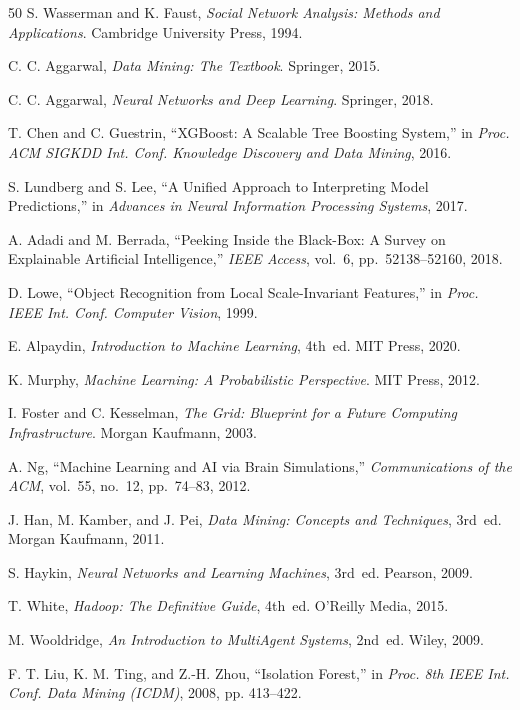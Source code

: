 \documentclass[conference]{IEEEtran}
\begin{document}
\begin{thebibliography}{50}
S. Wasserman and K. Faust, \textit{Social Network Analysis: Methods and Applications}. Cambridge University Press, 1994.

C. C. Aggarwal, \textit{Data Mining: The Textbook}. Springer, 2015.

C. C. Aggarwal, \textit{Neural Networks and Deep Learning}. Springer, 2018.

T. Chen and C. Guestrin, ``XGBoost: A Scalable Tree Boosting System,'' in \textit{Proc. ACM SIGKDD Int. Conf. Knowledge Discovery and Data Mining}, 2016.

S. Lundberg and S. Lee, ``A Unified Approach to Interpreting Model Predictions,'' in \textit{Advances in Neural Information Processing Systems}, 2017.

A. Adadi and M. Berrada, ``Peeking Inside the Black-Box: A Survey on Explainable Artificial Intelligence,'' \textit{IEEE Access}, vol.~6, pp.~52138--52160, 2018.

D. Lowe, ``Object Recognition from Local Scale-Invariant Features,'' in \textit{Proc. IEEE Int. Conf. Computer Vision}, 1999.

E. Alpaydin, \textit{Introduction to Machine Learning}, 4th~ed. MIT Press, 2020.

K. Murphy, \textit{Machine Learning: A Probabilistic Perspective}. MIT Press, 2012.

I. Foster and C. Kesselman, \textit{The Grid: Blueprint for a Future Computing Infrastructure}. Morgan Kaufmann, 2003.

A. Ng, ``Machine Learning and AI via Brain Simulations,'' \textit{Communications of the ACM}, vol.~55, no.~12, pp.~74--83, 2012.

J. Han, M. Kamber, and J. Pei, \textit{Data Mining: Concepts and Techniques}, 3rd~ed. Morgan Kaufmann, 2011.

S. Haykin, \textit{Neural Networks and Learning Machines}, 3rd~ed. Pearson, 2009.

T. White, \textit{Hadoop: The Definitive Guide}, 4th~ed. O'Reilly Media, 2015.

M. Wooldridge, \textit{An Introduction to MultiAgent Systems}, 2nd~ed. Wiley, 2009.

F. T. Liu, K. M. Ting, and Z.-H. Zhou, ``Isolation Forest,'' in \textit{Proc. 8th IEEE Int. Conf. Data Mining (ICDM)}, 2008, pp. 413--422.


\end{thebibliography}
\end{document}
